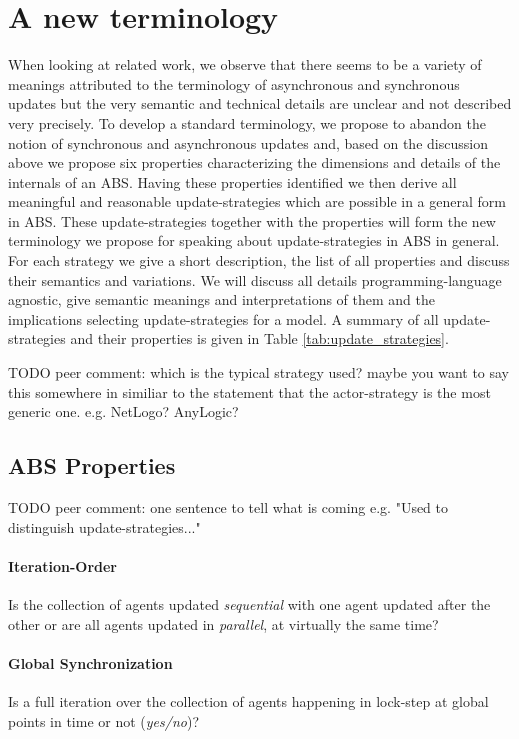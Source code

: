 \section{A new terminology}
When looking at related work, we observe that there seems to be a variety of meanings attributed to the terminology of asynchronous and synchronous updates but the very semantic and technical details are unclear and not described very precisely. To develop a standard terminology, we propose to abandon the notion of synchronous and asynchronous updates and, based on the discussion above we propose six properties characterizing the dimensions and details of the internals of an ABS. Having these properties identified we then derive all meaningful and reasonable update-strategies which are possible in a general form in ABS. These update-strategies together with the properties will form the new terminology we propose for speaking about update-strategies in ABS in general. For each strategy we give a short description, the list of all properties and discuss their semantics and variations. We will discuss all details programming-language agnostic, give semantic meanings and interpretations of them and the implications selecting update-strategies for a model. A summary of all update-strategies and their properties is given in Table \ref{tab:update_strategies}.

TODO peer comment: which is the typical strategy used? maybe you want to say this somewhere in similiar to the statement that the actor-strategy is the most generic one. e.g. NetLogo? AnyLogic?

\subsection{ABS Properties}
TODO peer comment: one sentence to tell what is coming e.g. "Used to distinguish update-strategies..."

\paragraph{Iteration-Order}
Is the collection of agents updated \textit{sequential} with one agent updated after the other or are all agents updated in \textit{parallel}, at virtually the same time?

\paragraph{Global Synchronization}
Is a full iteration over the collection of agents happening in lock-step at global points in time or not (\textit{yes/no})?

